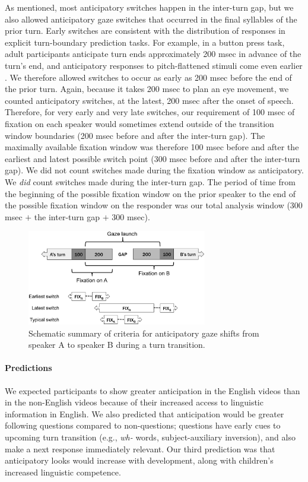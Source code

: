 \documentclass[authoryear, 12pt]{elsarticle}
\begin{document}
As mentioned, most anticipatory switches happen in the inter-turn gap, but we also allowed anticipatory gaze switches that occurred in the final syllables of the prior turn. Early switches are consistent with the distribution of responses in explicit turn-boundary prediction tasks. For example, in a button press task, adult participants anticipate turn ends approximately 200 msec in advance of the turn's end, and anticipatory responses to pitch-flattened stimuli come even earlier \citep{de-ruiter2006}. We therefore allowed switches to occur as early as 200 msec before the end of the prior turn. Again, because it takes 200 msec to plan an eye movement, we counted anticipatory switches, at the latest, 200 msec after the onset of speech. Therefore, for very early and very late switches, our requirement of 100 msec of fixation on each speaker would sometimes extend outside of the transition window boundaries (200 msec before and after the inter-turn gap). The maximally available fixation window was therefore 100 msec before and after the earliest and latest possible switch point (300 msec before and after the inter-turn gap). We did not count switches made during the fixation window as anticipatory. We \textit{did} count switches made during the inter-turn gap. The period of time from the beginning of the possible fixation window on the prior speaker to the end of the possible fixation window on the responder was our total analysis window (300 msec $+$ the inter-turn gap $+$ 300 msec).

\begin{figure}[t]
\begin{center}
\includegraphics[width=0.7\textwidth]{figures/FIG-AnticipCriteria.png}
\end{center}
\caption{Schematic summary of criteria for anticipatory gaze shifts from speaker A to speaker B during a turn transition.} 
\label{fig:criterion}
\end{figure}

\paragraph{Predictions}
We expected participants to show greater anticipation in the English videos than in the non-English videos because of their increased access to linguistic information in English. We also predicted that anticipation would be greater following questions compared to non-questions; questions have early cues to upcoming turn transition (e.g., \textit{wh-} words, subject-auxiliary inversion), and also make a next response immediately relevant. Our third prediction was that anticipatory looks would increase with development, along with children's increased linguistic competence.
\end{document}
